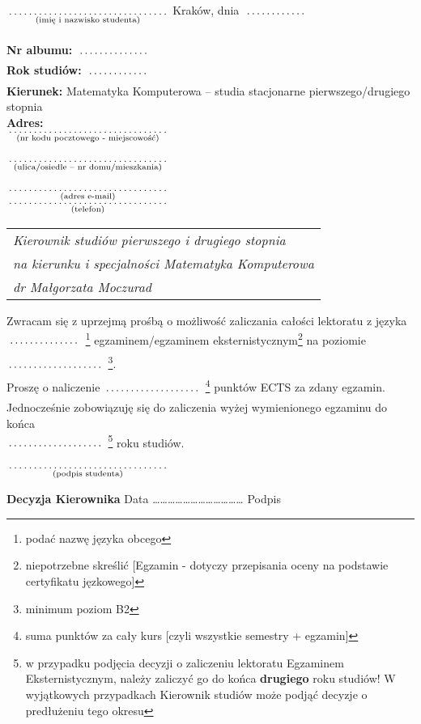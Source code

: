 \documentclass[a4paper,11pt]{article}
\newcommand{\fillField}[2]{
    $\underset{\text{#1}}{\parbox[t]{#2}{\dotfill}}$
}
\begin{document}
\noindent
\fillField{(imię i nazwisko studenta)}{5cm} \hfill Kraków, dnia \fillField{}{2cm} \\\\
\textbf{Nr albumu:}   \fillField{}{2.3cm}\\
\textbf{Rok studiów:} \fillField{}{2cm}\\
\textbf{Kierunek:} Matematyka Komputerowa -- studia stacjonarne pierwszego/drugiego stopnia\\
\textbf{Adres:}\\
\fillField{(nr kodu pocztowego - miejscowość)}{5cm}\\\\
\fillField{(ulica/osiedle – nr domu/mieszkania)}{5cm}\\\\
\fillField{(adres e-mail)}{5cm}\\
\fillField{(telefon)}{5cm}
\phantom{a}\hfill
\begin{tabular}[c]{@{}l@{}}
\textit{Kierownik studiów pierwszego i drugiego stopnia} \\
\textit{na kierunku i specjalności Matematyka Komputerowa}\\
\textit{dr Małgorzata Moczurad}
\end{tabular}

\vskip 2.0cm


\noindent
Zwracam się z uprzejmą prośbą o możliwość zaliczania całości
lektoratu z języka\fillField{}{2.3cm}\footnote{podać nazwę języka obcego} egzaminem/egzaminem eksternistycznym\footnote{niepotrzebne skreślić [Egzamin - dotyczy przepisania oceny na podstawie certyfikatu jęzkowego]}
na poziomie \fillField{}{3cm}\footnote{minimum poziom B2}. \\

\noindent
Proszę o naliczenie\fillField{}{3cm}\footnote{suma punktów za cały kurs [czyli wszystkie semestry + egzamin]} punktów ECTS za zdany egzamin.\\

\noindent
Jednocześnie zobowiązuję się do zaliczenia wyżej wymienionego egzaminu do końca\\\fillField{}{3cm}\footnote{w przypadku podjęcia decyzji o zaliczeniu lektoratu Egzaminem Eksternistycznym, należy zaliczyć go do końca \textbf{drugiego} roku studiów! W wyjątkowych przypadkach Kierownik studiów może podjąć decyzje o predłużeniu tego okresu} roku studiów.

\vskip 1cm

\hspace{\fill} \fillField{(podpis studenta)}{5cm} \hspace{2.0cm}
\vskip 3.0cm

\noindent
\textbf{Decyzja Kierownika} \dotfill
\vskip 0.5cm
\noindent
Data ……………………………… Podpis \dotfill
\end{document}
